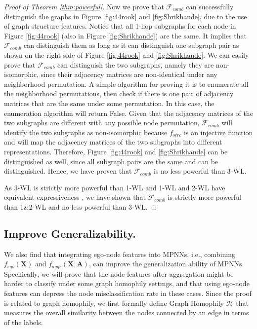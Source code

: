 \documentclass{article}
\theoremstyle{plain}
\begin{document}
\begin{proof}[Proof of Theorem \ref{thm:powerful}]
Now we prove that $\mathcal{F}_{comb}$ can successfully distinguish the graphs in Figure \ref{fig:44rook} and \ref{fig:Shrikhande}, due to the use of graph structure features.
Notice that all 1-hop subgraphs for each node in Figure \ref{fig:44rook} (also in Figure \ref{fig:Shrikhande}) are the same. It implies that $\mathcal{F}_{comb}$ can distinguish them as long as it can distinguish one subgraph pair as shown on the right side of Figure \ref{fig:44rook} and \ref{fig:Shrikhande}.
We can easily prove that $\mathcal{F}_{comb}$ can distinguish the two subgraphs, namely they are non-isomorphic, since their adjacency matrices are non-identical under any neighborhood permutation.
A simple algorithm for proving it is to enumerate all the neighborhood permutations, then check if there is one pair of adjacency matrices that are the same under some permutation. In this case, the enumeration algorithm will return False. 
Given that the adjacency matrices of the two subgraphs are different with any possible node permutation, $\mathcal{F}_{comb}$ will identify the two subgraphs as non-isomorphic because $f_{strc}$ is an injective function and will map the adjacency matrices of the two subgraphs into different representations. 
Therefore, Figure \ref{fig:44rook} and \ref{fig:Shrikhande} can be distinguished as well, since all subgraph pairs are the same and can be distinguished.
Hence, we have proven that $\mathcal{F}_{comb}$ is no less powerful than 3-WL.



As 3-WL is strictly more powerful than 1-WL \cite{sato2020survey} and 1-WL and 2-WL have equivalent expressiveness \cite{maron2019provably}, we have shown that $\mathcal{F}_{comb}$ is strictly more powerful than 1\&2-WL and no less powerful than 3-WL.
\end{proof}



\subsection{Improve Generalizability.}
We also find that integrating ego-node features into MPNNs, i.e., combining $f_{ego}(\mathbf{X})$ and $f_{aggr}(\mathbf{X},\mathbf{A})$, can improve the generalization ability of MPNNs. Specifically, we will prove that the node features after aggregation might be harder to classify under some graph homophily settings, and that using ego-node features can depress the node misclassification rate in these cases. Since the proof is related to graph homophily, we first formally define Graph Homophily $\mathcal{H}$ that measures the overall similarity between the nodes connected by an edge in terms of the labels.
\end{document}
